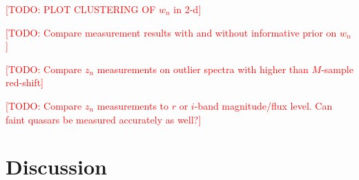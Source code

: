 \documentclass{article}
\newcommand{\red}[1]{\textcolor{red}{[TODO: #1]}}
\begin{document}
\red{PLOT CLUSTERING OF $w_n$ in 2-d}

\red{Compare measurement results with and without informative prior on $w_n$}

\red{Compare $z_n$ measurements on outlier spectra with higher than $M$-sample red-shift}

\red{Compare $z_n$ measurements to $r$ or $i$-band magnitude/flux level.  Can faint quasars be measured accurately as well?}

\section{Discussion}

 





\end{document}
